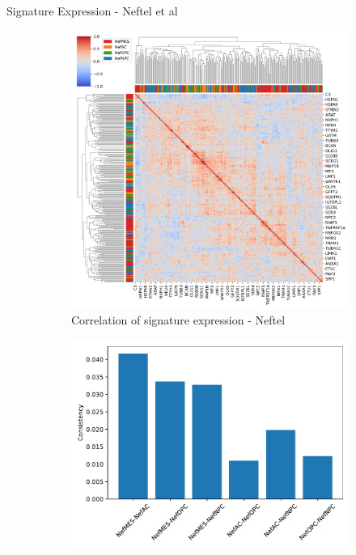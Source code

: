 \documentclass[aspectratio=169,9pt]{beamer}
\begin{document}
    \begin{frame}{Signature Expression - Neftel et al}
        \begin{adjustwidth}{-5cm}{-5cm}
            \centering
            \begin{figure}
                \centering
                \begin{subfigure}[c]{0.48\textwidth}
                    \centering
                    \includegraphics[width=\textwidth]{CCLE_Corrplot_Nef}
                    \caption{Correlation of signature expression - Neftel}
                \end{subfigure}
                \begin{subfigure}[c]{0.4\textwidth}
                    \centering
                    \includegraphics[width=\textwidth]{CCLE_Consistency_Nef}

\end{subfigure}
\end{figure}
\end{adjustwidth}
\end{frame}
\end{document}
